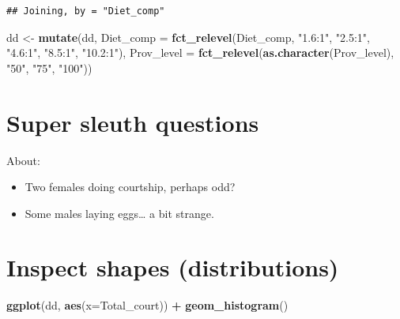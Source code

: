 \documentclass[]{book}
\newenvironment{Shaded}{\begin{snugshade}}{\end{snugshade}}
\newcommand{\DataTypeTok}[1]{\textcolor[rgb]{0.13,0.29,0.53}{#1}}
\newcommand{\KeywordTok}[1]{\textcolor[rgb]{0.13,0.29,0.53}{\textbf{#1}}}
\newcommand{\NormalTok}[1]{#1}
\newcommand{\OperatorTok}[1]{\textcolor[rgb]{0.81,0.36,0.00}{\textbf{#1}}}
\newcommand{\StringTok}[1]{\textcolor[rgb]{0.31,0.60,0.02}{#1}}
\providecommand{\tightlist}{%
  \setlength{\itemsep}{0pt}\setlength{\parskip}{0pt}}
\begin{document}
\begin{verbatim}
## Joining, by = "Diet_comp"
\end{verbatim}

\begin{Shaded}
\begin{Highlighting}[]
\NormalTok{dd <-}\StringTok{ }\KeywordTok{mutate}\NormalTok{(dd,}
             \DataTypeTok{Diet_comp =} \KeywordTok{fct_relevel}\NormalTok{(Diet_comp,}
                                            \StringTok{"1.6:1"}\NormalTok{,}
                                            \StringTok{"2.5:1"}\NormalTok{,}
                                            \StringTok{"4.6:1"}\NormalTok{,}
                                            \StringTok{"8.5:1"}\NormalTok{,}
                                            \StringTok{"10.2:1"}\NormalTok{),}
             \DataTypeTok{Prov_level =} \KeywordTok{fct_relevel}\NormalTok{(}\KeywordTok{as.character}\NormalTok{(Prov_level),}
                                            \StringTok{"50"}\NormalTok{,}
                                            \StringTok{"75"}\NormalTok{,}
                                            \StringTok{"100"}\NormalTok{))}
\end{Highlighting}
\end{Shaded}

\hypertarget{super-sleuth-questions}{%
\section{Super sleuth questions}\label{super-sleuth-questions}}

About:

\begin{itemize}
\tightlist
\item
  Two females doing courtship, perhaps odd?
\item
  Some males laying eggs\ldots{} a bit strange.
\end{itemize}

\hypertarget{inspect-shapes-distributions}{%
\section{Inspect shapes (distributions)}\label{inspect-shapes-distributions}}

\begin{Shaded}
\begin{Highlighting}[]
\KeywordTok{ggplot}\NormalTok{(dd, }\KeywordTok{aes}\NormalTok{(}\DataTypeTok{x=}\NormalTok{Total_court)) }\OperatorTok{+}
\StringTok{  }\KeywordTok{geom_histogram}\NormalTok{()}
\end{Highlighting}
\end{Shaded}
\end{document}
